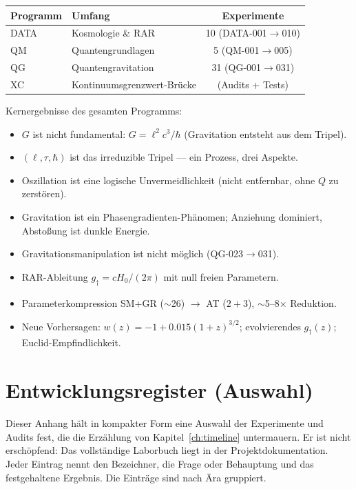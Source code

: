 \documentclass[10pt,twoside,openany]{book}
\begin{document}
\begin{center}
\begin{tabular}{llc}
\toprule
Programm & Umfang & Experimente \\
\midrule
DATA & Kosmologie \& RAR & 10 (DATA-001$\to$010) \\
QM & Quantengrundlagen & 5 (QM-001$\to$005) \\
QG & Quantengravitation & 31 (QG-001$\to$031) \\
XC & Kontinuumsgrenzwert-Brücke & (Audits + Tests) \\
\bottomrule
\end{tabular}
\end{center}

Kernergebnisse des gesamten Programms:
\begin{itemize}
\item $G$ ist nicht fundamental: $G=\ell^2c^3/\hbar$ (Gravitation entsteht aus dem
Tripel).
\item $(\ell,\tau,\hbar)$ ist das irreduzible Tripel — ein Prozess, drei Aspekte.
\item Oszillation ist eine logische Unvermeidlichkeit (nicht entfernbar, ohne $Q$ zu
zerstören).
\item Gravitation ist ein Phasengradienten-Phänomen; Anziehung dominiert, Abstoßung ist
dunkle Energie.
\item Gravitationsmanipulation ist nicht möglich (QG-023$\to$031).
\item RAR-Ableitung $g_\dagger=cH_0/(2\pi)$ mit null freien Parametern.
\item Parameterkompression SM+GR ($\sim$26) $\to$ AT ($2{+}3$), $\sim$5--8$\times$
Reduktion.
\item Neue Vorhersagen: $w(z)=-1+0.015(1+z)^{3/2}$; evolvierendes $g_\dagger(z)$;
Euclid-Empfindlichkeit.
\end{itemize}

\chapter{Entwicklungsregister (Auswahl)}
\label{app:ledger}

Dieser Anhang hält in kompakter Form eine Auswahl der Experimente und Audits fest, die
die Erzählung von Kapitel~\ref{ch:timeline} untermauern. Er ist nicht erschöpfend: Das
vollständige Laborbuch liegt in der Projektdokumentation. Jeder Eintrag nennt den
Bezeichner, die Frage oder Behauptung und das festgehaltene Ergebnis. Die Einträge sind
nach Ära gruppiert.
\end{document}
